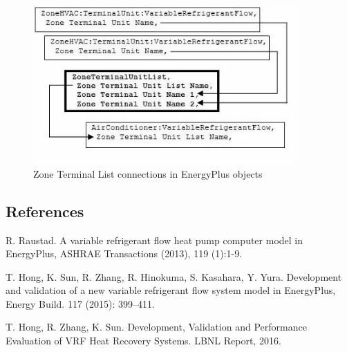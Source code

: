 \begin{figure}[hbtp] %
\centering
\includegraphics[width=0.9\textwidth, height=0.9\textheight, keepaspectratio=true]{media/image5454.png}
\caption{Zone Terminal List connections in EnergyPlus objects \protect \label{fig:zone-terminal-list-connections-in-energyplus}}
\end{figure}

\subsection{References}\label{references-051}

R. Raustad. A variable refrigerant flow heat pump computer model in EnergyPlus, ASHRAE Transactions (2013), 119 (1):1-9.

T. Hong, K. Sun, R. Zhang, R. Hinokuma, S. Kasahara, Y. Yura. Development and validation of a new variable refrigerant flow system model in EnergyPlus, Energy Build. 117 (2015): 399–411.

T. Hong, R. Zhang, K. Sun. Development, Validation and Performance Evaluation of VRF Heat Recovery Systems. LBNL Report, 2016.
